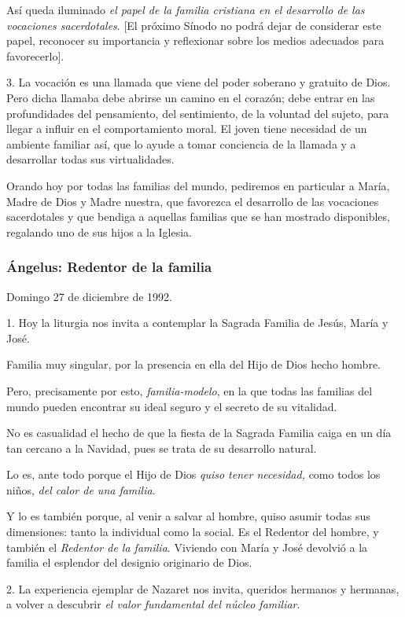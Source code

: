 Así queda iluminado \emph{el papel de la familia cristiana en el desarrollo de las vocaciones sacerdotales}. {[}El próximo Sínodo no podrá dejar de considerar este papel, reconocer su importancia y reflexionar sobre los medios adecuados para favorecerlo{]}.

3. La vocación es una llamada que viene del poder soberano y gratuito de Dios. Pero dicha llamaba debe abrirse un camino en el corazón; debe entrar en las profundidades del pensamiento, del sentimiento, de la voluntad del sujeto, para llegar a influir en el comportamiento moral. El joven tiene necesidad de un ambiente familiar así, que lo ayude a tomar conciencia de la llamada y a desarrollar todas sus virtualidades.

Orando hoy por todas las familias del mundo, pediremos en particular a María, Madre de Dios y Madre nuestra, que favorezca el desarrollo de las vocaciones sacerdotales y que bendiga a aquellas familias que se han mostrado disponibles, regalando uno de sus hijos a la Iglesia.

\subsubsection{Ángelus: Redentor de la familia}

Domingo 27 de diciembre de 1992.

1. Hoy la liturgia nos invita a contemplar la Sagrada Familia de Jesús, María y José.

Familia muy singular, por la presencia en ella del Hijo de Dios hecho hombre.

Pero, precisamente por esto, \emph{familia-modelo}, en la que todas las familias del mundo pueden encontrar su ideal seguro y el secreto de su vitalidad.

No es casualidad el hecho de que la fiesta de la Sagrada Familia caiga en un día tan cercano a la Navidad, pues se trata de su desarrollo natural.

Lo es, ante todo porque el Hijo de Dios \emph{quiso tener necesidad,} como todos los niños, \emph{del calor de una familia}.

Y lo es también porque, al venir a salvar al hombre, quiso asumir todas sus dimensiones: tanto la individual como la social. Es el Redentor del hombre, y también el \emph{Redentor de la familia}. Viviendo con María y José devolvió a la familia el esplendor del designio originario de Dios.

2. La experiencia ejemplar de Nazaret nos invita, queridos hermanos y hermanas, a volver a descubrir \emph{el valor fundamental del núcleo familiar}.

